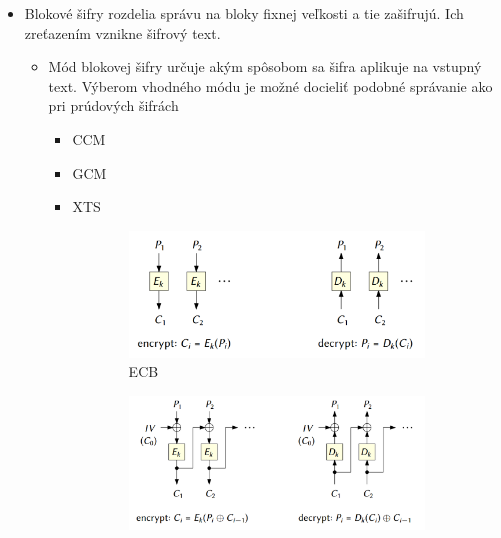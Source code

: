 \documentclass[12pt,a4paper]{article}
\begin{document}
{\begin{itemize}
        \item Blokové šifry rozdelia správu na bloky fixnej veľkosti a tie zašifrujú. Ich zreťazením vznikne šifrový text.
        \begin{itemize}
            \item Mód blokovej šifry určuje akým spôsobom sa šifra aplikuje na vstupný text. Výberom vhodného módu je možné docieliť podobné správanie ako pri prúdových šifrách
            \begin{itemize}
                \item CCM
                \item GCM
                \item XTS
            \end{itemize}
            \begin{figure}[htbp]
                \centering
                \begin{subfigure}[b]{0.4\textwidth}
                    \centering
                    \includegraphics[width=\textwidth]{ecb.png}
                    \caption{ECB}
                    \label{fig:sub1}
                \end{subfigure}
                \begin{subfigure}[b]{0.4\textwidth}
                    \centering
                    \includegraphics[width=\textwidth]{cbc.png}

\end{subfigure}
\end{figure}
\end{itemize}
\end{itemize}}
\end{document}
